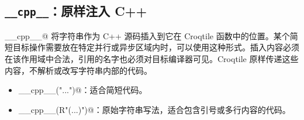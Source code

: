 \subsection*{\texttt{\_\_cpp\_\_}：原样注入 C++}

\co@__cpp__@ 将字符串作为 C++ 源码插入到它在 Croqtile 函数中的位置。某个简短目标操作需要放在特定并行或异步区域内时，可以使用这种形式。插入内容必须在该作用域中合法，引用的名字也必须对目标编译器可见。Croqtile 原样传递这些内容，不解析或改写字符串内部的代码。

\begin{itemize}[leftmargin=1.6em]
\item \co@__cpp__("...")@：适合简短代码。
\item \co@__cpp__(R"(...)")@：原始字符串写法，适合包含引号或多行内容的代码。
\end{itemize}
